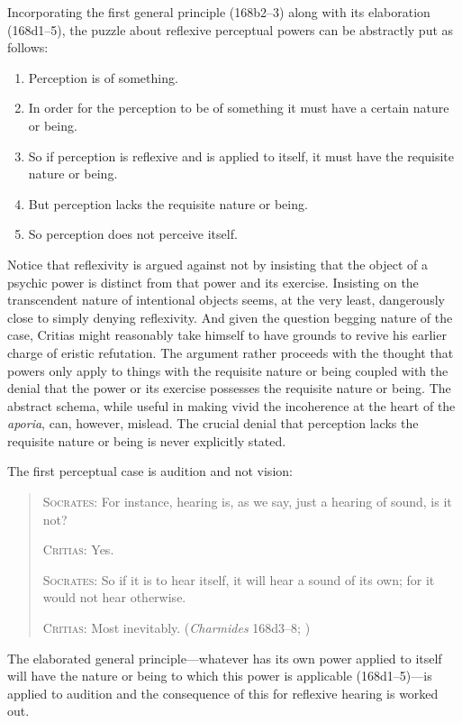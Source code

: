 Incorporating the first general principle (168b2–3) along with its elaboration (168d1–5), the puzzle about reflexive perceptual powers can be abstractly put as follows:
\begin{enumerate}[(1)]
	\item Perception is of something.
	\item In order for the perception to be of something it must have a certain nature or being.
	\item So if perception is reflexive and is applied to itself, it must have the requisite nature or being.
	\item But perception lacks the requisite nature or being.
	\item So perception does not perceive itself.
\end{enumerate} 
Notice that reflexivity is argued against not by insisting that the object of a psychic power is distinct from that power and its exercise. Insisting on the transcendent nature of intentional objects seems, at the very least, dangerously close to simply denying reflexivity. And given the question begging nature of the case, Critias might reasonably take himself to have grounds to revive his earlier charge of eristic refutation. The argument rather proceeds with the thought that powers only apply to things with the requisite nature or being coupled with the denial that the power or its exercise possesses the requisite nature or being. The abstract schema, while useful in making vivid the incoherence at the heart of the \emph{aporia}, can, however, mislead. The crucial denial that perception lacks the requisite nature or being is never explicitly stated.

The first perceptual case is audition and not vision:
\begin{quotation}
	\textsc{Socrates}: For instance, hearing is, as we say, just a hearing of sound, is it not?
	
	\textsc{Critias}: Yes.
	
	\textsc{Socrates}: So if it is to hear itself, it will hear a sound of its own; for it would not hear otherwise.
	
	\textsc{Critias}: Most inevitably. (\emph{Charmides} 168d3–8; \citealt[63]{Lamb:1927qw})
\end{quotation}
The elaborated general principle—whatever has its own power applied to itself will have the nature or being to which this power is applicable (168d1–5)—is applied to audition and the consequence of this for reflexive hearing is worked out.

